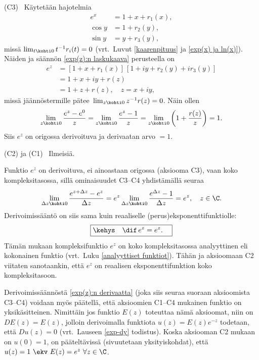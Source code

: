(C3) \ Käytetään hajotelmia
\begin{align*}
e^x &= 1+x+ r_1(x), \\
\cos y &= 1+ r_2(y), \\
\sin y &= y + r_3(y),
\end{align*}
missä $\lim_{t \kohti 0} t^{-1}r_i(t)=0$ (vrt.\ Luvut \ref{kaarenpituus} ja 
\ref{exp(x) ja ln(x)}). Näiden ja säännön \eqref{exp(z):n laskukaava} perusteella on
\begin{align*}
e^z &= [1+x+r_1(x)]\,[1+iy+r_2(y)+ir_3(y)] \\
    &= 1 + x +iy + r(z) \\
    & = 1+z+r(z), \quad z=x+iy,
\end{align*}
missä jäännöstermille pätee $\,\lim_{z \kohti 0} z^{-1}r(z)=0$. Näin ollen
\[
\lim_{z \kohti 0} \frac{e^z-e^0}{z} = \lim_{z \kohti 0} \frac{e^z-1}{z} 
                                    = \lim_{z \kohti 0} \left(1+\frac{r(z)}{z}\right) = 1.
\]
Siis $e^z$ on origossa derivoituva ja derivaatan arvo $=1$.

(C2) ja (C1) \ Ilmeisiä. \loppu

Funktio $e^z$ on derivoituva, ei ainoastaan origossa (aksiooma C3), vaan koko
kompleksitasossa, sillä ominaisuudet C3--C4 yhdistämällä seuraa
\[
\lim_{\Delta z \kohti 0} \frac{e^{z+\Delta z}-e^z}{\Delta z} 
           = e^z \lim_{\Delta z \kohti 0} \frac{e^{\Delta z}-1}{\Delta z} = e^z, \quad z\in\C.
\]
Derivoimissääntö on siis sama kuin reaaliselle (perus)eksponenttifunktiolle:
%
\begin{equation} \label{exp(z):n derivaatta}
\boxed{\kehys\quad \dif\,e^z = e^z.\quad}
\end{equation}
Tämän mukaan kompleksifunktio $e^z$ on koko kompleksitasossa analyyttinen eli kokonainen funktio 
(vrt.\ Luku \ref{analyyttiset funktiot}). Tähän ja aksioomaan C2 viitaten sanotaankin,
%
että $e^z$ on reaalisen eksponenttifunktion  koko kompleksitasoon.

Derivoimissäännöstä \eqref{exp(z):n derivaatta} (joka siis seuraa suoraan aksioomista 
C3--C4) voidaan myös päätellä, että aksioomien C1--C4 mukainen funktio on yksikäsitteinen.
Nimittäin jos funktio $E(z)$ toteuttaa nämä aksioomat, niin on $DE(z)=E(z)$, jolloin
derivoimalla funktiota $u(z)=E(z)e^{-z}$ todetaan, että $Du(z)=0$ 
(vrt.\ Lauseen \ref{exp-dy} todistus). Koska aksiooman C2 mukaan on $u(0)=1$, on
pääteltävissä (sivuutetaan yksityiskohdat), että $u(z)=1\ \ekv\ E(z)=e^z\ \forall z\in\C$.

